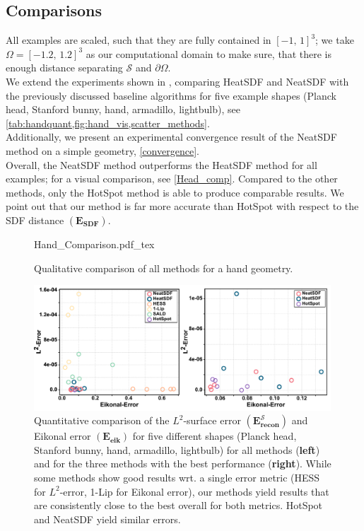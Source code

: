 \documentclass[12pt,openany]{book}
\theoremstyle{plainnormal}
\theoremstyle{remark}
\begin{document}
\subsection{Comparisons}
All examples are scaled, such that they are fully contained in $[-1,\,1]^3$; we take $\Omega = [-1.2, \,1.2]^3$ as our computational domain to make sure, that there is enough distance separating $\mathcal S$ and $\partial \Omega$. \\
We extend the experiments shown in \cite{weidemaier2025sdfsunorientedpointclouds}, comparing HeatSDF and NeatSDF with the previously discussed baseline algorithms for five example shapes (Planck head, Stanford bunny, hand, armadillo, lightbulb), see \cref{tab:handquant,fig:hand_vis,scatter_methods}. \\
Additionally, we present an experimental convergence result of the NeatSDF method on a simple geometry, \cref{convergence}. \\
Overall, the NeatSDF method outperforms the HeatSDF method for all examples; for a visual comparison, see \cref{Head_comp}. Compared to the other methods, only the HotSpot method is able to produce comparable results. We point out that our method is far more accurate than HotSpot with respect to the SDF distance $\mathbf {(E_{SDF})}$.
\begin{figure}[t]
    \centering
    \begingroup
    \sffamily
    \def\svgwidth{0.95\textwidth}
    {Hand_Comparison.pdf_tex}
    \endgroup
    \caption{Qualitative comparison of all methods for a hand geometry.}
    \label{fig:hand_vis}
\end{figure}
\begin{figure}[b]
    \centering
    \includegraphics[width =0.99\textwidth]{Figures/method_comparison_lager_letters.pdf}
    
   
    \caption{Quantitative comparison of the $L^2$-surface error $\mathbf{(E_{recon}^{\mathcal{S}})}$ and Eikonal error $\mathbf{(E_{\text{eik}})}$ for five different shapes (Planck head, Stanford bunny, hand, armadillo, lightbulb) for all methods (\textbf{left}) and for the three methods with the best performance (\textbf{right}). While some methods show good results wrt. a single error metric (HESS for $L^2$-error, 1-Lip for Eikonal error), our methods yield results that are consistently close to the best overall for both metrics. HotSpot and NeatSDF yield similar errors.}  \label{scatter_methods}
\end{figure}
\end{document}
